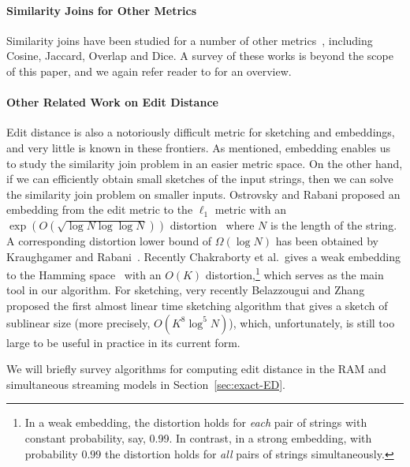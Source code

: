 
\paragraph{Similarity Joins for Other Metrics} 
Similarity joins have been studied for a number of other metrics~\cite{GJKMS01,AGK06,BMS07,LLL08,XWLY08,WLF12,LDW11,ZLG11}, including Cosine, Jaccard, Overlap and Dice.  A survey of these works is beyond the scope of this paper, and we again refer reader to \cite{JLFL14} for an overview.   



\paragraph{Other Related Work on Edit Distance}
Edit distance is also a notoriously difficult metric for sketching and embeddings, and very little is known in these frontiers.  As mentioned, embedding enables us to study the similarity join problem in an easier metric space. On the other hand, if we can efficiently obtain small sketches of the input strings, then we can solve the similarity join problem on smaller inputs.
Ostrovsky and Rabani proposed an embedding from the edit metric to the $\ell_1$ metric with an $\exp(O(\sqrt{\log N\log\log N}))$ distortion~\cite{OR07} where $N$ is the length of the string. A corresponding distortion lower bound of $\Omega(\log N)$ has been obtained by Kraughgamer and Rabani~\cite{KR09}.  Recently Chakraborty et al.\ gives a weak embedding to the Hamming space~\cite{CGK16} with an $O(K)$ distortion,\footnote{In a weak embedding, the distortion holds for {\em each} pair of strings with constant probability, say, 0.99. In contrast, in a strong embedding, with probability $0.99$ the distortion holds for {\em all} pairs of strings simultaneously.} which serves as the main tool in our algorithm.   For sketching, very recently Belazzougui and Zhang~\cite{BZ16} proposed the first almost linear time sketching algorithm that gives a sketch of sublinear size (more precisely, $O(K^8 \log^5 N)$), which, unfortunately, is still too large to be useful in practice in its current form. 

We will briefly survey algorithms for computing edit distance in the RAM and simultaneous streaming models in Section~\ref{sec:exact-ED}.

